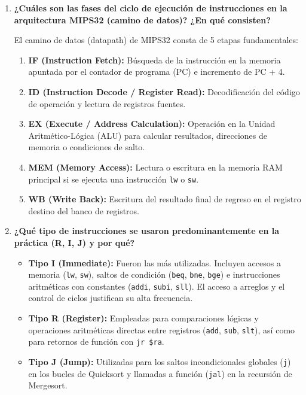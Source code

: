 \documentclass[12pt,letterpaper]{article}
\begin{document}
\begin{enumerate}
    \newpage
    \item \textbf{\large\color{UCBlue}¿Cuáles son las fases del ciclo de ejecución de instrucciones en la arquitectura MIPS32 (camino de datos)? ¿En qué consisten?}
    
    \vspace{0.2cm}
    El camino de datos (datapath) de MIPS32 consta de 5 etapas fundamentales:
    \begin{enumerate}[label=\arabic*., leftmargin=15pt]
        \item \textbf{IF (Instruction Fetch):} Búsqueda de la instrucción en la memoria apuntada por el contador de programa (PC) e incremento de PC + 4.
        \item \textbf{ID (Instruction Decode / Register Read):} Decodificación del código de operación y lectura de registros fuentes.
        \item \textbf{EX (Execute / Address Calculation):} Operación en la Unidad Aritmético-Lógica (ALU) para calcular resultados, direcciones de memoria o condiciones de salto.
        \item \textbf{MEM (Memory Access):} Lectura o escritura en la memoria RAM principal si se ejecuta una instrucción \texttt{lw} o \texttt{sw}.
        \item \textbf{WB (Write Back):} Escritura del resultado final de regreso en el registro destino del banco de registros.
    \end{enumerate}

    \item \textbf{\large\color{UCBlue}¿Qué tipo de instrucciones se usaron predominantemente en la práctica (R, I, J) y por qué?}
    
    \vspace{0.2cm}
    \begin{itemize}
        \item \textbf{Tipo I (Immediate):} Fueron las más utilizadas. Incluyen accesos a memoria (\texttt{lw}, \texttt{sw}), saltos de condición (\texttt{beq}, \texttt{bne}, \texttt{bge}) e instrucciones aritméticas con constantes (\texttt{addi}, \texttt{subi}, \texttt{sll}). El acceso a arreglos y el control de ciclos justifican su alta frecuencia.
        \item \textbf{Tipo R (Register):} Empleadas para comparaciones lógicas y operaciones aritméticas directas entre registros (\texttt{add}, \texttt{sub}, \texttt{slt}), así como para retornos de función con \texttt{jr \$ra}.
        \item \textbf{Tipo J (Jump):} Utilizadas para los saltos incondicionales globales (\texttt{j}) en los bucles de Quicksort y llamadas a función (\texttt{jal}) en la recursión de Mergesort.
    \end{itemize}


\end{enumerate}
\end{document}
